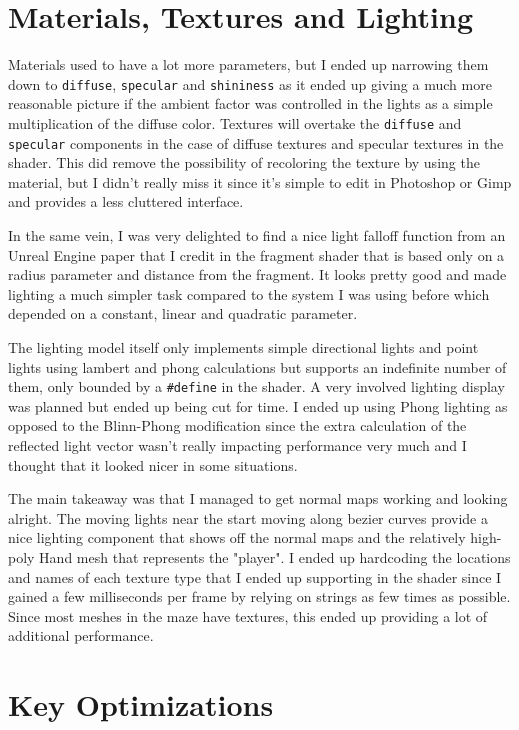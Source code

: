 \documentclass[11pt]{article}
\begin{document}
\section{Materials, Textures and Lighting}
\label{sec:org35c074b}

Materials used to have a lot more parameters, but I ended up narrowing them down to \texttt{diffuse}, \texttt{specular} and \texttt{shininess} as it ended up giving a much more reasonable picture if the ambient factor was controlled in the lights as a simple multiplication of the diffuse color. Textures will overtake the \texttt{diffuse} and \texttt{specular} components in the case of diffuse textures and specular textures in the shader. This did remove the possibility of recoloring the texture by using the material, but I didn't really miss it since it's simple to edit in Photoshop or Gimp and provides a less cluttered interface.

In the same vein, I was very delighted to find a nice light falloff function from an Unreal Engine paper that I credit in the fragment shader that is based only on a radius parameter and distance from the fragment. It looks pretty good and made lighting a much simpler task compared to the system I was using before which depended on a constant, linear and quadratic parameter.

The lighting model itself only implements simple directional lights and point lights using lambert and phong calculations but supports an indefinite number of them, only bounded by a \texttt{\#define} in the shader. A very involved lighting display was planned but ended up being cut for time. I ended up using Phong lighting as opposed to the Blinn-Phong modification since the extra calculation of the reflected light vector wasn't really impacting performance very much and I thought that it looked nicer in some situations.

The main takeaway was that I managed to get normal maps working and looking alright. The moving lights near the start moving along bezier curves provide a nice lighting component that shows off the normal maps and the relatively high-poly Hand mesh that represents the "player". I ended up hardcoding the locations and names of each texture type that I ended up supporting in the shader since I gained a few milliseconds per frame by relying on strings as few times as possible. Since most meshes in the maze have textures, this ended up providing a lot of additional performance.

\section{Key Optimizations}
\label{sec:org97469ad}
\end{document}
